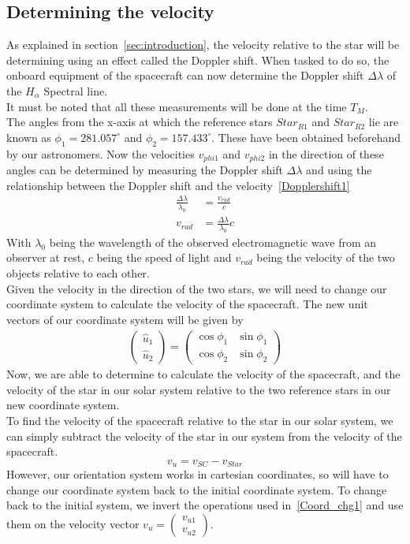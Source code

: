 \documentclass[reprint,english,notitlepage]{revtex4-2}
\begin{document}
\subsection{Determining the velocity}\label{subsec:determining-the-velocity}
As explained in section~\ref{sec:introduction}, the velocity relative to the star will be determining using an effect called the Doppler shift.
When tasked to do so, the onboard equipment of the spacecraft can now determine the Doppler shift $\Delta \lambda$ of the $H_{\alpha}$ Spectral line.\\
It must be noted that all these measurements will be done at the time $T_M$.\\
The angles from the x-axis at which the reference stars $Star_{R1}$ and $Star_{R2}$ lie are known as $\phi_1 = 281.057^{\circ}$ and $\phi_2 = 157.433^{\circ}$.
These have been obtained beforehand by our astronomers.
Now the velocities $v_{phi1}$ and $v_{phi2}$ in the direction of these angles can be determined by measuring the Doppler shift $\Delta \lambda$ and using the relationship between the Doppler shift and the velocity~\eqref{Dopplershift1}
\begin{align}
    \frac{\Delta \lambda}{\lambda_0} &= \frac{v_{rad}}{c} \label{Dopplershift1}\\
	v_{rad} &= \frac{\Delta \lambda}{\lambda_0} c \label{Dopplershift2}
\end{align}
With $\lambda_0$ being the wavelength of the observed electromagnetic wave from an observer at rest, $c$ being the speed of light and $v_{rad}$ being the velocity of the two objects relative to each other.\\
Given the velocity in the direction of the two stars, we will need to change our coordinate system to calculate the velocity of the spacecraft.
The new unit vectors of our coordinate system will be given by
\begin{align}\label{Coord_chg1}
\begin{pmatrix}
    \hat{u}_1 \\
	\hat{u}_2
\end{pmatrix} =
\begin{pmatrix}
    \cos \phi_1 & \sin \phi_1\\
	\cos \phi_2 & \sin \phi_2
\end{pmatrix}
\end{align}
Now, we are able to determine to calculate the velocity of the spacecraft, and the velocity of the star in our solar system relative to the two reference stars in our new coordinate system.\\
To find the velocity of the spacecraft relative to the star in our solar system, we can simply subtract the velocity of the star in our system from the velocity of the spacecraft.
\[
v_u = v_{SC}-v_{Star}
\]
However, our orientation system works in cartesian coordinates, so will have to change our coordinate system back to the initial coordinate system.
To change back to the initial system, we invert the operations used in~\eqref{Coord_chg1} and use them on the velocity vector
$v_u = \begin{pmatrix}
    v_{u1}\\ v_{u2}
\end{pmatrix}$.
\end{document}
